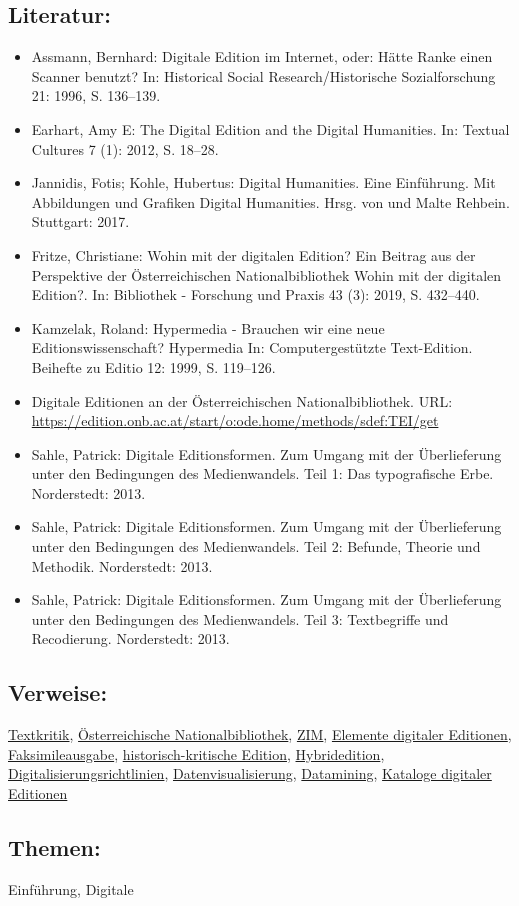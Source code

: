 \documentclass{article}
\begin{document}
        \subsection*{Literatur:}\begin{itemize}\item Assmann, Bernhard: Digitale Edition im Internet, oder: Hätte Ranke einen Scanner benutzt? In: Historical Social Research/Historische Sozialforschung 21: 1996, S. 136–139.\item Earhart, Amy E: The Digital Edition and the Digital Humanities. In: Textual Cultures 7 (1): 2012, S. 18–28.\item Jannidis, Fotis; Kohle, Hubertus: Digital Humanities. Eine Einführung. Mit Abbildungen und Grafiken Digital Humanities. Hrsg. von  und Malte Rehbein. Stuttgart: 2017.\item Fritze, Christiane: Wohin mit der digitalen Edition? Ein Beitrag aus der Perspektive der Österreichischen Nationalbibliothek Wohin mit der digitalen Edition?. In: Bibliothek - Forschung und Praxis 43 (3): 2019, S. 432–440.\item Kamzelak, Roland: Hypermedia - Brauchen wir eine neue Editionswissenschaft? Hypermedia In: Computergestützte Text-Edition. Beihefte zu Editio 12: 1999, S. 119–126.\item Digitale Editionen an der Österreichischen Nationalbibliothek. URL: \url{https://edition.onb.ac.at/start/o:ode.home/methods/sdef:TEI/get}\item Sahle, Patrick: Digitale Editionsformen. Zum Umgang mit der Überlieferung unter den Bedingungen des Medienwandels. Teil 1: Das typografische Erbe. Norderstedt: 2013.\item Sahle, Patrick: Digitale Editionsformen. Zum Umgang mit der Überlieferung unter den Bedingungen des Medienwandels. Teil 2: Befunde, Theorie und Methodik. Norderstedt: 2013.\item Sahle, Patrick: Digitale Editionsformen. Zum Umgang mit der Überlieferung unter den Bedingungen des Medienwandels. Teil 3: Textbegriffe und Recodierung. Norderstedt: 2013.\end{itemize}\subsection*{Verweise:}\href{https://gams.uni-graz.at/o:konde.192}{Textkritik}, \href{https://gams.uni-graz.at/o:konde.153}{Österreichische Nationalbibliothek}, \href{https://gams.uni-graz.at/o:konde.217}{ZIM}, \href{https://gams.uni-graz.at/o:konde.80}{Elemente digitaler Editionen}, \href{https://gams.uni-graz.at/o:konde.83}{Faksimileausgabe}, \href{https://gams.uni-graz.at/o:konde.93}{historisch-kritische Edition}, \href{https://gams.uni-graz.at/o:konde.96}{Hybridedition}, \href{https://gams.uni-graz.at/o:konde.63}{Digitalisierungsrichtlinien}, \href{https://gams.uni-graz.at/o:konde.54}{Datenvisualisierung}, \href{https://gams.uni-graz.at/o:konde.48}{Datamining}, \href{https://gams.uni-graz.at/o:konde.102}{Kataloge digitaler Editionen}\subsection*{Themen:}Einführung, Digitale 
\end{document}

